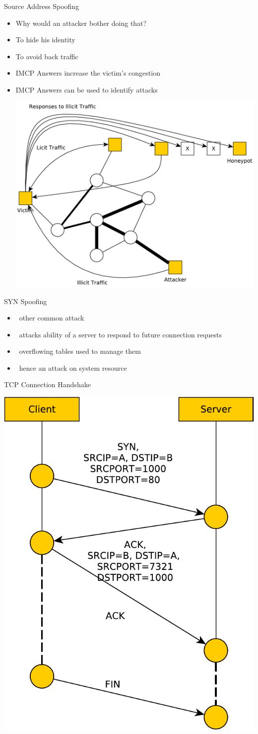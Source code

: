 \documentclass{beamer}
\begin{document}
\begin{frame}{Source Address Spoofing }
  \begin{itemize}
  \item Why would an attacker bother doing that?
  \item To hide his identity
  \item To avoid back traffic
  \item IMCP Answers increase the victim's congestion
  \item IMCP Answers can be used to identify attacks
  \begin{center}
    \includegraphics[width=0.6\linewidth]{dos4}
  \end{center}
  \end{itemize}
\end{frame}

\begin{frame}{SYN Spoofing }
  \begin{itemize}
  \item  other common attack 
  \item  attacks ability of a server to respond to future 
    connection requests 
  \item  overflowing tables used to manage them 
  \item  hence an attack on system resource
  \end{itemize}
\end{frame}


\begin{frame}{TCP Connection Handshake}
  \begin{center}
    \includegraphics[width=0.5\linewidth]{syn1}
  \end{center}
\end{frame}
\end{document}

